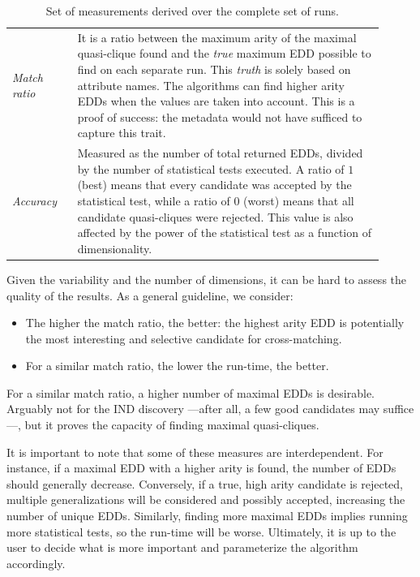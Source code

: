 \begin{table}[ht]
    \caption{Set of measurements derived over the complete set of runs.}
    \label{tab:derived_measurements}
    \centering
    \begin{tabular}{p{0.16\linewidth} p{0.75\linewidth}}
        \emph{Match ratio} & It is a ratio between the maximum arity of the maximal
        quasi-clique found and the \textit{true} maximum EDD possible to find on
        each separate run.
        This \emph{truth} is solely based on attribute names. The algorithms can
        find higher arity EDDs when the values are taken into account.
        This is a proof of success: the metadata would not have sufficed to capture
        this trait. \\
        
        \emph{Accuracy} & Measured as the number of total returned EDDs, divided by
        the number of statistical tests executed. A ratio of $1$ (best) means that every
        candidate was accepted by the statistical test, while a ratio of $0$ (worst)
        means that all candidate quasi-cliques were rejected. This value is
        also affected by the power of the statistical test as a function of
        dimensionality.\\
    \end{tabular}
\end{table}

Given the variability and the number of dimensions, it can be hard to assess the quality
of the results. As a general guideline, we consider:

\begin{itemize}
    \item The higher the match ratio, the better: the highest arity EDD
    is potentially the most interesting and selective candidate for cross-matching.
    \item For a similar match ratio, the lower the run-time, the better.
\end{itemize}

For a similar match ratio, a higher number of maximal EDDs is desirable. Arguably not
for the IND discovery ---after all, a few good candidates may suffice---,
but it proves the capacity of finding maximal quasi-cliques.

It is important to note that some of these measures are interdependent. For instance,
if a maximal EDD with a higher arity is found, the number of EDDs should generally decrease.
Conversely, if a true, high arity candidate is rejected, multiple generalizations will be considered
and possibly accepted, increasing the number of unique EDDs.
Similarly, finding more maximal EDDs implies running more statistical
tests, so the run-time will be worse. Ultimately, it is up to the user to decide what is
more important and parameterize the algorithm accordingly.

